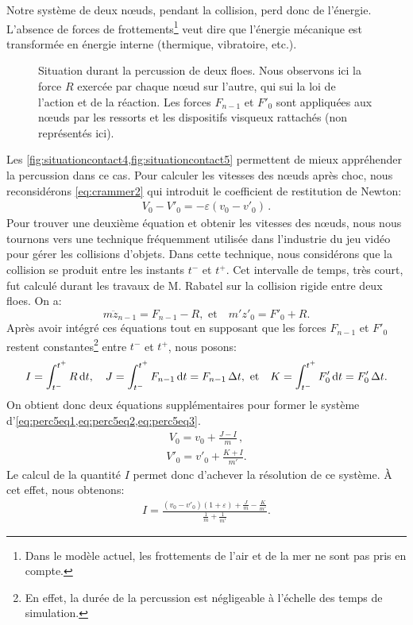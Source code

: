 Notre système de deux n\oe{}uds, pendant la collision, perd donc de l'énergie. L'absence de forces de frottements\footnote{Dans le modèle actuel, les frottements de l'air et de la mer ne sont pas pris en compte.} veut dire que l'énergie mécanique est transformée en énergie interne (thermique, vibratoire, etc.). 
\begin{figure}[!h]
    \centering
    \caption{Situation durant la percussion de deux floes. Nous observons ici la force $R$ exercée par chaque n\oe{}ud sur l'autre, qui sui la loi de l'action et de la réaction. Les forces $F_{n-1}$ et $F'_0$ sont appliquées aux n\oe{}uds par les ressorts et les dispositifs visqueux rattachés (non représentés ici).}
    \label{fig:situationcontact5}
\end{figure}
Les \cref{fig:situationcontact4,fig:situationcontact5} permettent de mieux appréhender la percussion dans ce cas. Pour calculer les vitesses des n\oe{}uds après choc, nous reconsidérons \cref{eq:crammer2} qui introduit le coefficient de restitution de Newton:
\begin{align} \label{eq:perc5eq1}
    V_0 - V'_0 = - \varepsilon (v_0 - v'_0) \,.
\end{align}
Pour trouver une deuxième équation et obtenir les vitesses des n\oe{}uds, nous nous tournons vers une technique fréquemment utilisée dans l'industrie du jeu vidéo\parencite{hecker1997collision} pour gérer les collisions d'objets. Dans cette technique, nous considérons que la collision se produit entre les instants $t^{-}$ et $t^{+}$. Cet intervalle de temps, très court, fut calculé durant les travaux de M. Rabatel \parencite[p.87]{rabatel2015thesis} sur la collision rigide entre deux floes. On a:
$$
m \ddot z_{n-1} = F_{n-1} - R, \text{ et} \quad  m'z'_0 = F'_0 + R.
$$
Après avoir intégré ces équations tout en supposant que les forces $F_{n-1}$ et $F'_0$ restent constantes\footnote{En effet, la durée de la percussion est négligeable à l'échelle des temps de simulation.} entre $t^{-}$ et $t^{+}$, nous posons:
$$
I = \int_{t^{-}}^{t^{+}} R \diff t, \quad  J = \int_{t^{-}}^{t^{+}} F_{n-1} \diff t = F_{n-1} \, \Delta t, \text{ et} \quad  K = \int_{t^{-}}^{t^{+}} F'_{0} \diff t = F'_{0} \, \Delta t.
$$
On obtient donc deux équations supplémentaires pour former le système d'\cref{eq:perc5eq1,eq:perc5eq2,eq:perc5eq3}.
\begin{align} \label{eq:perc5eq2}
    V_0 = v_0 + \frac{J-I}{m} \,,
\end{align}
\begin{align} \label{eq:perc5eq3}
    V'_0 = v'_0 + \frac{K+I}{m'}.
\end{align}
Le calcul de la quantité $I$ permet donc d'achever la résolution de ce système. À cet effet, nous obtenons:
\begin{align}
    I = \frac{(v_0 - v'_0)(1+\varepsilon) +\frac{J}{m} - \frac{K}{m'}}{\frac{1}{m}+\frac{1}{m'}}.
\end{align}

